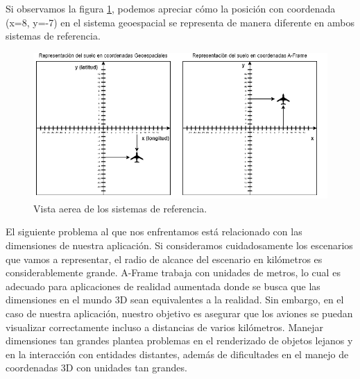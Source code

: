 \documentclass[a4paper, 11pt]{book}
\begin{document}
Si observamos la figura \ref{fig:sistemasDeReferencia}, podemos apreciar cómo la posición con coordenada (x=8, y=-7) en el sistema geoespacial se representa de manera diferente en ambos sistemas de referencia.
\begin{figure}[h]
  \centering
  \includegraphics[width=13cm, keepaspectratio]{img/sistemasDeReferencia.drawio.png}
  \caption{Vista aerea de los sistemas de referencia.}
  \label{fig:sistemasDeReferencia}
\end{figure}

El siguiente problema al que nos enfrentamos está relacionado con las dimensiones de nuestra aplicación. Si consideramos cuidadosamente los escenarios que vamos a representar, el radio de alcance del escenario en kilómetros es considerablemente grande. A-Frame trabaja con unidades de metros, lo cual es adecuado para aplicaciones de realidad aumentada donde se busca que las dimensiones en el mundo 3D sean equivalentes a la realidad. Sin embargo, en el caso de nuestra aplicación, nuestro objetivo es asegurar que los aviones se puedan visualizar correctamente incluso a distancias de varios kilómetros. Manejar dimensiones tan grandes plantea problemas en el renderizado de objetos lejanos y en la interacción con entidades distantes, además de dificultades en el manejo de coordenadas 3D con unidades tan grandes.
\end{document}
